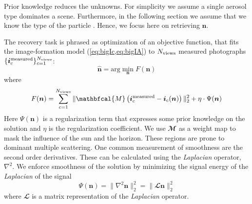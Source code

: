 \documentclass[10pt,letterpaper]{article}
\newcommand{\Mask}{\mathbfcal{M}}
\newcommand{\Laplacian}{\mathbfcal{L}}
\newcommand{\argmin}{\mathrm{arg}\min}
\newcommand{\roundy}[1]{\left(#1\right)}
\begin{document}
Prior knowledge reduces the unknowns. For simplicity we assume a
single aerosol type dominates a scene. Furthermore, in the following
section we assume that we know the type of the particle
\cite{Martonchik2009}. Hence, we focus here on retrieving ${\bm n}$.

The recovery task is phrased as optimization of an objective function,
that fits the image-formation model (\cref{eq:bigIc,eq:bigIA}) to
$N_{\rm views}$ measured photographs $\{ {\bm i}^{\rm
measured}_c\}_{c=1}^{N_{\rm views}}$:
\begin{equation}
  \label{eq:minobjectiveA}
  \hat{\bm n} =
  \argmin_{{\bm n}} F({\bm n})
\end{equation}
where
\begin{equation}
  \label{eq:objectiveA}
  F({\bm n})
  = \sum_{c=1}^{N_{\rm views}}
  \| \Mask \roundy{{\bm i}^{\rm measured}_c - {\bm i}_c({\bm n})}\|^2_2 + \eta \cdot \Psi({\bm n})
\end{equation}
Here $\Psi({\bm n})$ is a regularization term that expresses some
prior knowledge on the solution and $\eta$ is the regularization
coefficient.
We use $\Mask$ as a weight map to mask the influence of the sun and
the horizon. These regions are prone to dominant multiple scattering.
One common measurement of smoothness are the second order derivatives.
These can be calculated using the \emph{Laplacian} operator, $\nabla^2$.
We enforce smoothness of the solution by minimizing the signal energy
of the \emph{Laplacian} of the signal
\begin{equation}
  \label{eq:regularizer}
  \Psi({\bm n}) = \| \nabla^2{\bm n}\|^2_2 = \| \Laplacian{\bm n}\|^2_2
\end{equation}
where $\Laplacian$ is a matrix representation of the \emph{Laplacian} operator.
\end{document}
